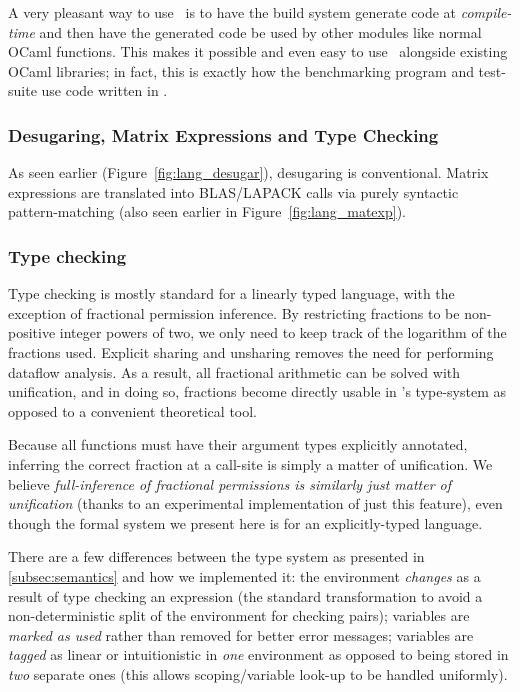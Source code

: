 A very pleasant way to use \lang\ is to have the build system generate code at
\emph{compile-time} and then have the generated code be used by other modules
like normal OCaml functions. This makes it possible and even easy to use \lang\
alongside existing OCaml libraries; in fact, this is exactly how the
benchmarking program and test-suite use code written in \lang.

\subsubsection{Desugaring, Matrix Expressions and Type Checking}

As seen earlier (Figure~\ref{fig:lang_desugar}), desugaring is conventional.
Matrix expressions are translated into BLAS/LAPACK calls via purely syntactic
pattern-matching (also seen earlier in Figure~\ref{fig:lang_matexp}).

\subsubsection{Type checking}

Type checking is mostly standard for a linearly typed language,
with the exception of fractional permission inference. By restricting fractions
to be non-positive integer powers of two, we only need to keep track of the
logarithm of the fractions used. Explicit sharing and unsharing removes the
need for performing dataflow analysis. As a result, all fractional arithmetic
can be solved with unification, and in doing so, fractions become directly
usable in \lang's type-system as opposed to a convenient theoretical tool.

Because all functions must have their argument types explicitly annotated,
inferring the correct fraction at a call-site is simply a matter of
unification. We believe \emph{full-inference of fractional permissions is
similarly just matter of unification} (thanks to an experimental implementation
of just this feature), even though the formal system we present here is for an
explicitly-typed language.

There are a few differences between the type system as presented in
\ref{subsec:semantics} and how we implemented it: the environment
\emph{changes} as a result of type checking an expression (the standard
transformation to avoid a non-deterministic split of the environment for
checking pairs); variables are \emph{marked as used} rather than removed for
better error messages; variables are \emph{tagged} as linear or intuitionistic
in \emph{one} environment as opposed to being stored in \emph{two} separate
ones (this allows scoping/variable look-up to be handled uniformly).

